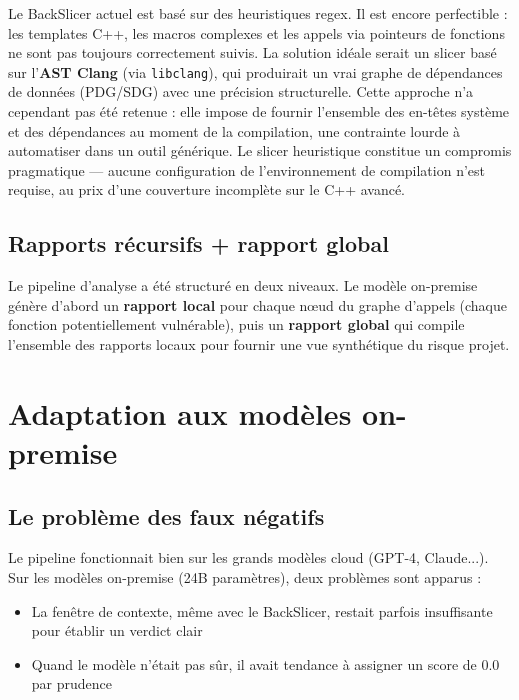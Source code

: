 \documentclass[a4paper, 12pt, hidelinks]{article}
\begin{document}
Le BackSlicer actuel est basé sur des heuristiques regex. Il est encore perfectible : les templates C++, les macros complexes et les appels via pointeurs de fonctions ne sont pas toujours correctement suivis. La solution idéale serait un slicer basé sur l'\textbf{AST Clang} (via \texttt{libclang}), qui produirait un vrai graphe de dépendances de données (PDG/SDG) avec une précision structurelle. Cette approche n'a cependant pas été retenue : elle impose de fournir l'ensemble des en-têtes système et des dépendances au moment de la compilation, une contrainte lourde à automatiser dans un outil générique. Le slicer heuristique constitue un compromis pragmatique --- aucune configuration de l'environnement de compilation n'est requise, au prix d'une couverture incomplète sur le C++ avancé.

\subsection*{Rapports récursifs + rapport global}

Le pipeline d'analyse a été structuré en deux niveaux. Le modèle on-premise génère d'abord un \textbf{rapport local} pour chaque nœud du graphe d'appels (chaque fonction potentiellement vulnérable), puis un \textbf{rapport global} qui compile l'ensemble des rapports locaux pour fournir une vue synthétique du risque projet.

\section{Adaptation aux modèles on-premise}

\subsection*{Le problème des faux négatifs}

Le pipeline fonctionnait bien sur les grands modèles cloud (GPT-4, Claude...). Sur les modèles on-premise (24B paramètres), deux problèmes sont apparus :

\begin{itemize}
  \item La fenêtre de contexte, même avec le BackSlicer, restait parfois insuffisante pour établir un verdict clair
  \item Quand le modèle n'était pas sûr, il avait tendance à assigner un score de 0.0 par prudence
\end{itemize}
\end{document}
